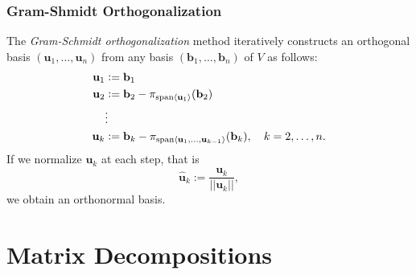 \documentclass[12pt,openany]{book}
\theoremstyle{definition}
\newcommand{\Span}[1]{\textnormal{span}\langle #1\rangle}
\newcommand{\norms}[1]{|| #1||}
\renewcommand{\vec}[1]{\textbf{#1}}
\begin{document}
	\subsection{Gram-Shmidt Orthogonalization}
	The \textit{Gram-Schmidt orthogonalization} method iteratively constructs an orthogonal basis \((\textbf{u}_1,\dots,\textbf{u}_n)\) from any basis \((\vec{b}_1,\dots,\vec{b}_n)\) of \(V\) as follows: \begin{align*}
		\vec{u}_1&:=\vec{b}_1\\
		\vec{u}_2&:=\vec{b}_2-\pi_{\Span{\vec{u}_1}}(\vec{b}_2)\\
		&\vdots\\
		\vec{u}_k&:=\vec{b}_k-\pi_{\Span{\vec{u}_1,\dots,\vec{u}_{k-1}}}(\vec{b}_k),\quad k=2,\dots, n.
	\end{align*}
	If we normalize \(\vec{u}_k\) at each step, that is \[
	\hat{\vec{u}}_k:=\frac{\vec{u}_k}{\norms{\vec{u}_k}},
	\] we obtain an orthonormal basis.
	
	\newpage
	\chapter{Matrix Decompositions}
\end{document}
